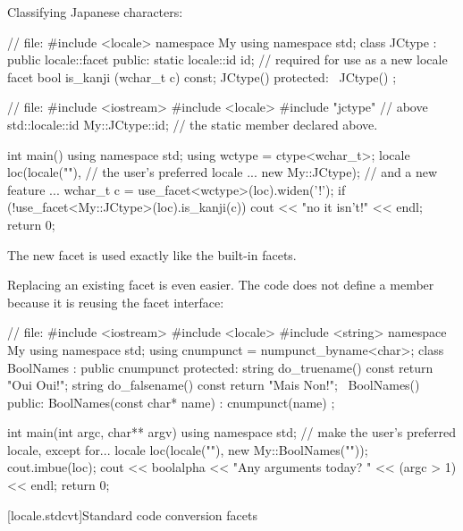 \pnum
\begin{example}
Classifying Japanese characters:

\begin{codeblock}
// file: 
#include <locale>
namespace My {
  using namespace std;
  class JCtype : public locale::facet {
  public:
    static locale::id id;       // required for use as a new locale facet
    bool is_kanji (wchar_t c) const;
    JCtype() { }
  protected:
    ~JCtype() { }
  };
}

// file: 
#include <iostream>
#include <locale>
#include "jctype"               // above
std::locale::id My::JCtype::id; // the static  member declared above.

int main() {
  using namespace std;
  using wctype = ctype<wchar_t>;
  locale loc(locale(""),        // the user's preferred locale ...
         new My::JCtype);       // and a new feature ...
  wchar_t c = use_facet<wctype>(loc).widen('!');
  if (!use_facet<My::JCtype>(loc).is_kanji(c))
    cout << "no it isn't!" << endl;
  return 0;
}
\end{codeblock}

\pnum
The new facet is used exactly like the built-in facets.
\end{example}

\pnum
\begin{example}
Replacing an existing facet is even easier.
The code does not define a member
because it is reusing the
facet interface:

\begin{codeblock}
// file: 
#include <iostream>
#include <locale>
#include <string>
namespace My {
  using namespace std;
  using cnumpunct = numpunct_byname<char>;
  class BoolNames : public cnumpunct {
  protected:
    string do_truename()  const { return "Oui Oui!"; }
    string do_falsename() const { return "Mais Non!"; }
    ~BoolNames() { }
  public:
    BoolNames(const char* name) : cnumpunct(name) { }
  };
}

int main(int argc, char** argv) {
  using namespace std;
  // make the user's preferred locale, except for...
  locale loc(locale(""), new My::BoolNames(""));
  cout.imbue(loc);
  cout << boolalpha << "Any arguments today? " << (argc > 1) << endl;
  return 0;
}
\end{codeblock}
\end{example}

[locale.stdcvt]{Standard code conversion facets}


